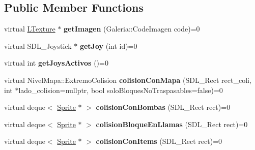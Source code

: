 \subsection*{Public Member Functions}
\begin{DoxyCompactItemize}
\item 
virtual \hyperlink{class_l_texture}{L\+Texture} $\ast$ {\bfseries get\+Imagen} (Galeria\+::\+Code\+Imagen code)=0\hypertarget{class_interfaz_juego_ab222b3f39dea890b71acdc3150e66d6d}{}\label{class_interfaz_juego_ab222b3f39dea890b71acdc3150e66d6d}

\item 
virtual S\+D\+L\+\_\+\+Joystick $\ast$ {\bfseries get\+Joy} (int id)=0\hypertarget{class_interfaz_juego_aed1ee6c2c0b68dfb5cdb9a0514bfc1f1}{}\label{class_interfaz_juego_aed1ee6c2c0b68dfb5cdb9a0514bfc1f1}

\item 
virtual int {\bfseries get\+Joys\+Activos} ()=0\hypertarget{class_interfaz_juego_aafadb2ec09cf94823e48e884a609a054}{}\label{class_interfaz_juego_aafadb2ec09cf94823e48e884a609a054}

\item 
virtual Nivel\+Mapa\+::\+Extremo\+Colision {\bfseries colision\+Con\+Mapa} (S\+D\+L\+\_\+\+Rect rect\+\_\+coli, int $\ast$lado\+\_\+colision=nullptr, bool solo\+Bloques\+No\+Traspasables=false)=0\hypertarget{class_interfaz_juego_ab744f7c22be984491e63dcbd5b05c556}{}\label{class_interfaz_juego_ab744f7c22be984491e63dcbd5b05c556}

\item 
virtual deque$<$ \hyperlink{class_sprite}{Sprite} $\ast$ $>$ {\bfseries colision\+Con\+Bombas} (S\+D\+L\+\_\+\+Rect rect)=0\hypertarget{class_interfaz_juego_a78f25518403ce658e93e528dc99ac5b9}{}\label{class_interfaz_juego_a78f25518403ce658e93e528dc99ac5b9}

\item 
virtual deque$<$ \hyperlink{class_sprite}{Sprite} $\ast$ $>$ {\bfseries colision\+Bloque\+En\+Llamas} (S\+D\+L\+\_\+\+Rect rect)=0\hypertarget{class_interfaz_juego_a4d3aa11daa5f3e98d7f3cfe4cb00b636}{}\label{class_interfaz_juego_a4d3aa11daa5f3e98d7f3cfe4cb00b636}

\item 
virtual deque$<$ \hyperlink{class_sprite}{Sprite} $\ast$ $>$ {\bfseries colision\+Con\+Items} (S\+D\+L\+\_\+\+Rect rect)=0\hypertarget{class_interfaz_juego_abb32e88a7358328dc66bdcf1538976bc}{}\label{class_interfaz_juego_abb32e88a7358328dc66bdcf1538976bc}


\end{DoxyCompactItemize}
